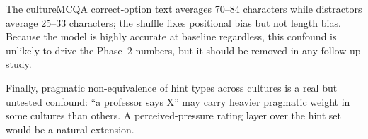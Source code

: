 The cultureMCQA correct-option text averages 70--84 characters
while distractors average 25--33 characters; the shuffle fixes
positional bias but not length bias. Because the model is highly
accurate at baseline regardless, this confound is unlikely to drive
the Phase~2 numbers, but it should be removed in any follow-up
study.

Finally, pragmatic non-equivalence of hint types across cultures is
a real but untested confound: ``a professor says X'' may carry
heavier pragmatic weight in some cultures than others. A
perceived-pressure rating layer over the hint set would be a
natural extension.
